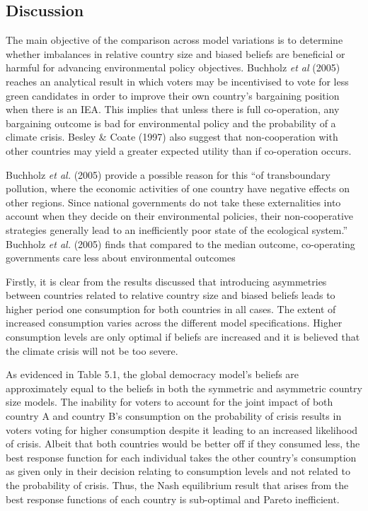 \documentclass[11pt,preprint, authoryear]{elsarticle}
\numberwithin{equation}{section}
\numberwithin{figure}{section}
\numberwithin{table}{section}
\begin{document}
\hypertarget{discussion}{%
\subsection{Discussion}\label{discussion}}

The main objective of the comparison across model variations is to
determine whether imbalances in relative country size and biased beliefs
are beneficial or harmful for advancing environmental policy objectives.
Buchholz \emph{et al} (2005) reaches an analytical result in which
voters may be incentivised to vote for less green candidates in order to
improve their own country's bargaining position when there is an IEA.
This implies that unless there is full co-operation, any bargaining
outcome is bad for environmental policy and the probability of a climate
crisis. Besley \& Coate (1997) also suggest that non-cooperation with
other countries may yield a greater expected utility than if
co-operation occurs.

Buchholz \emph{et al.} (2005) provide a possible reason for this ``of
transboundary pollution, where the economic activities of one country
have negative effects on other regions. Since national governments do
not take these externalities into account when they decide on their
environmental policies, their non-cooperative strategies generally lead
to an inefficiently poor state of the ecological system.'' Buchholz
\emph{et al.} (2005) finds that compared to the median outcome,
co-operating governments care less about environmental outcomes

Firstly, it is clear from the results discussed that introducing
asymmetries between countries related to relative country size and
biased beliefs leads to higher period one consumption for both countries
in all cases. The extent of increased consumption varies across the
different model specifications. Higher consumption levels are only
optimal if beliefs are increased and it is believed that the climate
crisis will not be too severe.

As evidenced in Table 5.1, the global democracy model's beliefs are
approximately equal to the beliefs in both the symmetric and asymmetric
country size models. The inability for voters to account for the joint
impact of both country A and country B's consumption on the probability
of crisis results in voters voting for higher consumption despite it
leading to an increased likelihood of crisis. Albeit that both countries
would be better off if they consumed less, the best response function
for each individual takes the other country's consumption as given only
in their decision relating to consumption levels and not related to the
probability of crisis. Thus, the Nash equilibrium result that arises
from the best response functions of each country is sub-optimal and
Pareto inefficient.
\end{document}
